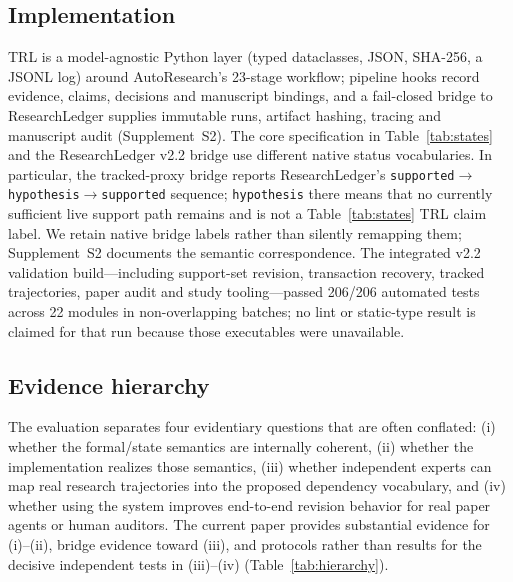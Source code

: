 \documentclass[cmc,article,submit,moreauthors,pdftex]{Definitions/tsp}
\newcommand{\suppl}[1]{Supplement~#1}
\begin{document}
\subsection{Implementation}
TRL is a model-agnostic Python layer (typed dataclasses, JSON, SHA-256, a JSONL log) around AutoResearch's 23-stage workflow; pipeline hooks record evidence, claims, decisions and manuscript bindings, and a fail-closed bridge to ResearchLedger supplies immutable runs, artifact hashing, tracing and manuscript audit (\suppl{S2}). The core specification in Table~\ref{tab:states} and the ResearchLedger v2.2 bridge use different native status vocabularies. In particular, the tracked-proxy bridge reports ResearchLedger's \texttt{supported}$\to$\texttt{hypothesis}$\to$\texttt{supported} sequence; \texttt{hypothesis} there means that no currently sufficient live support path remains and is not a Table~\ref{tab:states} TRL claim label. We retain native bridge labels rather than silently remapping them; Supplement~S2 documents the semantic correspondence. The integrated v2.2 validation build---including support-set revision, transaction recovery, tracked trajectories, paper audit and study tooling---passed 206/206 automated tests across 22 modules in non-overlapping batches; no lint or static-type result is claimed for that run because those executables were unavailable.

\subsection{Evidence hierarchy}
The evaluation separates four evidentiary questions that are often conflated: (i) whether the formal/state semantics are internally coherent, (ii) whether the implementation realizes those semantics, (iii) whether independent experts can map real research trajectories into the proposed dependency vocabulary, and (iv) whether using the system improves end-to-end revision behavior for real paper agents or human auditors. The current paper provides substantial evidence for (i)--(ii), bridge evidence toward (iii), and protocols rather than results for the decisive independent tests in (iii)--(iv) (Table~\ref{tab:hierarchy}).
\end{document}

